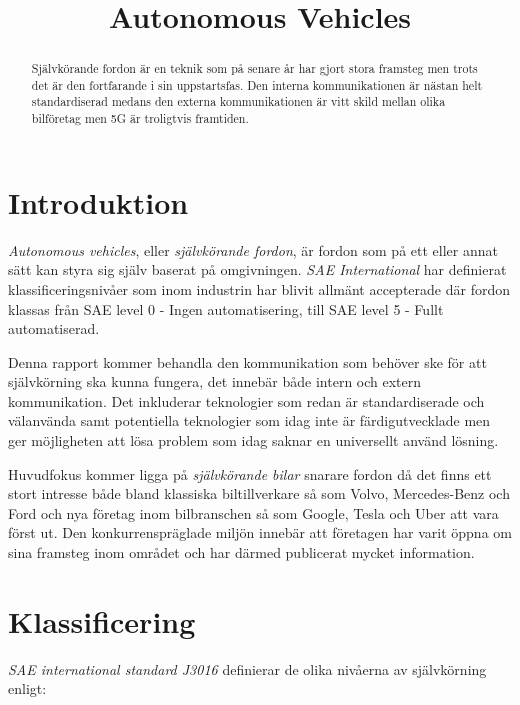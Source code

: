 \documentclass[a4paper]{IEEEtran}
\title{Autonomous Vehicles}
\author{\IEEEauthorblockN{Niklas Hedström, Emil Wihlander\\ }
\IEEEauthorblockA{Lunds Tekniska Högskola\\
Lund, Sverige\\
Email: \{dat15ewi, dat15nhe\}@student.lu.se}}
\begin{document}
\maketitle

\begin{abstract}
Självkörande fordon är en teknik som på senare år har gjort stora framsteg men trots det är den fortfarande i sin uppstartsfas. Den interna kommunikationen är nästan helt standardiserad medans den externa kommunikationen är vitt skild mellan olika bilföretag men 5G är troligtvis framtiden.
\end{abstract}


\section{Introduktion}
\emph{Autonomous vehicles}, eller \emph{självkörande fordon}, är fordon som på ett eller annat sätt kan styra sig själv baserat på omgivningen. 
\emph{SAE International} har definierat klassificeringsnivåer som inom industrin har blivit allmänt accepterade där fordon klassas från SAE level 0 - Ingen automatisering, till SAE level 5 - Fullt automatiserad. \cite{SAE2014} 

Denna rapport kommer behandla den kommunikation som behöver ske för att självkörning ska kunna fungera, det innebär både intern och extern kommunikation. 
Det inkluderar teknologier som redan är standardiserade och välanvända samt potentiella teknologier som idag inte är färdigutvecklade men ger möjligheten att lösa problem som idag saknar en universellt använd lösning.

Huvudfokus kommer ligga på \emph{självkörande bilar} snarare fordon då det finns ett stort intresse både bland klassiska biltillverkare så som Volvo, Mercedes-Benz och Ford och nya företag inom bilbranschen så som Google, Tesla och Uber att vara först ut. 
Den konkurrenspräglade miljön innebär att företagen har varit öppna om sina framsteg inom området och har därmed publicerat mycket information. \cite{VolvoAD,MercedesAD,FordAD,GoogleAD,TeslaAD,UberAD}

\section{Klassificering}
\emph{SAE international standard J3016} definierar de olika nivåerna av självkörning enligt: \cite{SAE2014}
\end{document}
